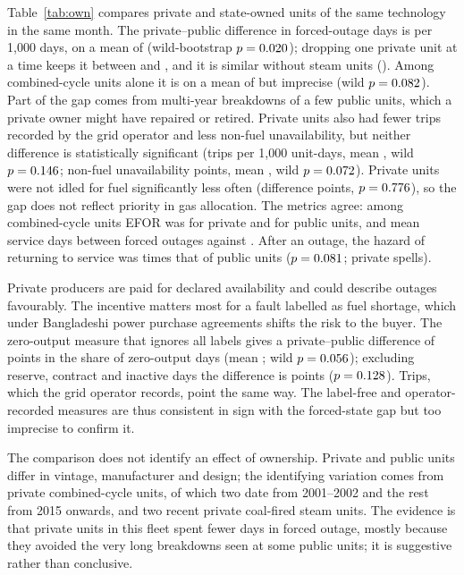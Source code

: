 \documentclass[11pt]{article}
\begin{document}
Table~\ref{tab:own} compares private and state-owned units of the same technology in the same month. The private--public difference in forced-outage days is \ownForcedB{} per 1,000 days, on a mean of \ownForcedMean{} (wild-bootstrap $p=0.020$); dropping one private unit at a time keeps it between \ownLooLo{} and \ownLooHi, and it is similar without steam units (\ownNoSteamB). Among combined-cycle units alone it is \ownCcgtB{} on a mean of \ownCcgtMean{} but imprecise (wild $p=0.082$). Part of the gap comes from multi-year breakdowns of a few public units, which a private owner might have repaired or retired. Private units also had fewer trips recorded by the grid operator and less non-fuel unavailability, but neither difference is statistically significant (trips \ownTripB{} per 1,000 unit-days, mean \ownTripMean, wild $p=0.146$; non-fuel unavailability \ownNonfuelB{} points, mean \ownNonfuelMean, wild $p=0.072$). Private units were not idled for fuel significantly less often (difference \ownFuelIdleB{} points, $p=0.776$), so the gap does not reflect priority in gas allocation. The metrics agree: among combined-cycle units EFOR was \ieeeCcPrivEFOR{} for private and \ieeeCcPubEFOR{} for public units, and mean service days between forced outages \ieeeCcPrivMTBF{} against \ieeeCcPubMTBF. After an outage, the hazard of returning to service was \coxPrivHR{} times that of public units ($p=0.081$; \coxPrivN{} private spells).

Private producers are paid for declared availability and could describe outages favourably. The incentive matters most for a fault labelled as fuel shortage, which under Bangladeshi power purchase agreements shifts the risk to the buyer. The zero-output measure that ignores all labels gives a private--public difference of \ownZeroB{} points in the share of zero-output days (mean \ownZeroMean; wild $p=0.056$); excluding reserve, contract and inactive days the difference is \ownZeroExclB{} points ($p=0.128$). Trips, which the grid operator records, point the same way. The label-free and operator-recorded measures are thus consistent in sign with the forced-state gap but too imprecise to confirm it.

The comparison does not identify an effect of ownership. Private and public units differ in vintage, manufacturer and design; the identifying variation comes from \nPrivCcgt{} private combined-cycle units, of which two date from 2001--2002 and the rest from 2015 onwards, and two recent private coal-fired steam units. The evidence is that private units in this fleet spent fewer days in forced outage, mostly because they avoided the very long breakdowns seen at some public units; it is suggestive rather than conclusive.
\end{document}
